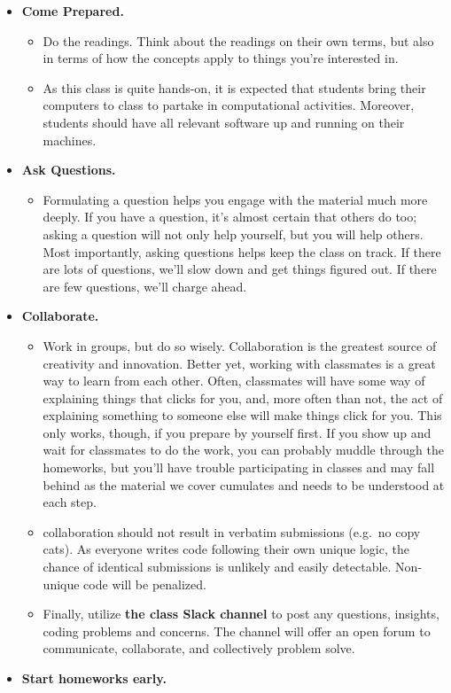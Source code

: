\documentclass[
  12pt,
]{article}
\providecommand{\tightlist}{%
  \setlength{\itemsep}{0pt}\setlength{\parskip}{0pt}}
\begin{document}
\begin{itemize}
\item
  \textbf{Come Prepared.}

  \begin{itemize}
  \item
    Do the readings. Think about the readings on their own terms, but
    also in terms of how the concepts apply to things you're interested
    in.
  \item
    As this class is quite hands-on, it is expected that students bring
    their computers to class to partake in computational activities.
    Moreover, students should have all relevant software up and running
    on their machines.
  \end{itemize}
\item
  \textbf{Ask Questions.}

  \begin{itemize}
  \tightlist
  \item
    Formulating a question helps you engage with the material much more
    deeply. If you have a question, it's almost certain that others do
    too; asking a question will not only help yourself, but you will
    help others. Most importantly, asking questions helps keep the class
    on track. If there are lots of questions, we'll slow down and get
    things figured out. If there are few questions, we'll charge ahead.
  \end{itemize}
\item
  \textbf{Collaborate.}

  \begin{itemize}
  \item
    Work in groups, but do so wisely. Collaboration is the greatest
    source of creativity and innovation. Better yet, working with
    classmates is a great way to learn from each other. Often,
    classmates will have some way of explaining things that clicks for
    you, and, more often than not, the act of explaining something to
    someone else will make things click for you. This only works,
    though, if you prepare by yourself first. If you show up and wait
    for classmates to do the work, you can probably muddle through the
    homeworks, but you'll have trouble participating in classes and may
    fall behind as the material we cover cumulates and needs to be
    understood at each step.
  \item
    collaboration should not result in verbatim submissions (e.g.~no
    copy cats). As everyone writes code following their own unique
    logic, the chance of identical submissions is unlikely and easily
    detectable. Non-unique code will be penalized.
  \item
    Finally, utilize \textbf{the class Slack channel} to post any
    questions, insights, coding problems and concerns. The channel will
    offer an open forum to communicate, collaborate, and collectively
    problem solve.
  \end{itemize}
\item
  \textbf{Start homeworks early.}


\end{itemize}
\end{document}
